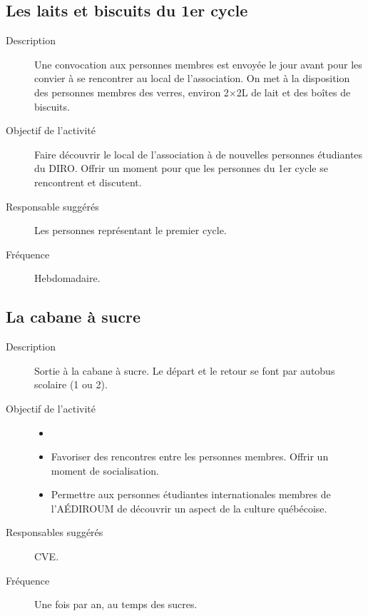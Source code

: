 \documentclass{aediroum}
\begin{document}
\subsection{Les laits et biscuits du 1er cycle}\label{sec:laits-et-biscuits}
\begin{description}
	\item[Description] Une convocation aux personnes membres est envoyée le jour avant pour les convier à se rencontrer au local de l'association. On met à la disposition des personnes membres des verres, environ 2$\times$2L de lait et des boîtes de biscuits.
	\item[Objectif de l'activité] Faire découvrir le local de l'association à de nouvelles personnes étudiantes du DIRO. Offrir un moment pour que les personnes du 1er cycle se rencontrent et discutent.
	\item[Responsable suggérés] Les personnes représentant le premier cycle.
	\item[Fréquence] Hebdomadaire.
\end{description}

\subsection{La cabane à sucre}\label{sec:cabane-a-sucre}
\begin{description}
	\item[Description] Sortie à la cabane à sucre. Le départ et le retour se font par autobus scolaire (1 ou 2).
	\item[Objectif de l'activité]
	\begin{itemize}
            \item[]
            \item Favoriser des rencontres entre les personnes membres. Offrir un moment de socialisation.
            \item Permettre aux personnes étudiantes internationales membres de l'AÉDIROUM de découvrir un aspect de la culture québécoise.
	\end{itemize}
	\item[Responsables suggérés] CVE.
	\item[Fréquence] Une fois par an, au temps des sucres.
\end{description}
\end{document}

